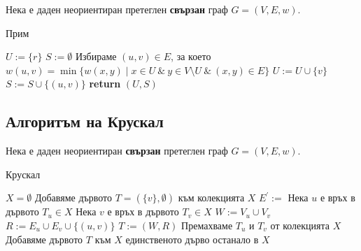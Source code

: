 Нека е даден неориентиран претеглен {\bf свързан} граф $G = (V,E,w)$.

\begin{algorithm}[H]
  \caption{Прим}

  \begin{algorithmic}[1]
    \State $U := \{r\}$
    \State $S := \emptyset$
    \State Избираме $(u,v) \in E$, за което
    \State $w(u,v) = \min\{w(x,y) \mid x\in U\ \&\ y \in V\setminus U\ \&\ (x,y) \in E\}$
    \State $U := U\cup\{v\}$
    \State $S := S \cup\{(u,v)\}$
    \EndWhile
    \State \textbf{return} $(U,S)$
    \EndProcedure
  \end{algorithmic}
\end{algorithm}


\subsection{Алгоритъм на Крускал}

Нека е даден неориентиран {\bf свързан} претеглен граф $G = (V,E,w)$.

\begin{algorithm}[h!]
  \caption{Крускал}
  
  \begin{algorithmic}[1]
    \State $X = \emptyset$
    \State Добавяме дървото $T = (\{v\},\emptyset)$ към колекцията $X$
    \EndFor
    \State$E^\prime := $
    \Statex
    \State Нека $u$ е връх в дървото $T_u \in X$
    \State Нека $v$ е връх в дървото $T_v \in X$
    \State $W := V_u\cup V_v$
    \State $R := E_u\cup E_v\cup\{(u,v)\}$
    \State $T := (W,R)$
    \State Премахваме $T_u$ и $T_v$ от колекцията $X$
    \State Добавяме дървото $T$ към $X$
    \EndIf
    \EndFor
    \State \Return единственото дърво останало в $X$
    \EndProcedure
  \end{algorithmic}
\end{algorithm}

